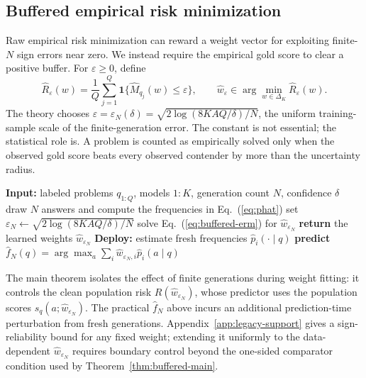 \subsection{Buffered empirical risk minimization}
\label{sec:method-buffer}

Raw empirical risk minimization can reward a weight vector for exploiting
finite-\(N\) sign errors near zero.  We instead require the empirical gold
score to clear a positive buffer.  For \(\varepsilon\ge0\), define
\begin{equation}
\widehat R_\varepsilon(w)
=
\frac1Q\sum_{j=1}^Q
\mathbf 1\{\widehat M_{q_j}(w)\le\varepsilon\},
\qquad
\widehat w_\varepsilon\in
\arg\min_{w\in\Delta_K}\widehat R_\varepsilon(w).
\label{eq:buffered-erm}
\end{equation}
The theory chooses
\(\varepsilon=\varepsilon_N(\delta)
=\sqrt{2\log(8KAQ/\delta)/N}\), the uniform training-sample scale of the
finite-generation error.  The constant is not essential; the statistical
role is.  A problem is counted as empirically solved only when the observed
gold score beats every observed contender by more than the uncertainty
radius.

\begin{algorithm}[t]
\caption{Margin-buffered weighted voting}
\label{alg:buffered}
\begin{algorithmic}[1]
\STATE \textbf{Input:} labeled problems \(q_{1:Q}\), models \(1{:}K\),
generation count \(N\), confidence \(\delta\)
  \STATE draw \(N\) answers and compute the frequencies in
  Eq.~(\ref{eq:phat})
\ENDFOR
\STATE set
\(\varepsilon_N\leftarrow\sqrt{2\log(8KAQ/\delta)/N}\)
\STATE solve Eq.~(\ref{eq:buffered-erm}) for
\(\widehat w_{\varepsilon_N}\)
\STATE \textbf{return} the learned weights \(\widehat w_{\varepsilon_N}\)
\STATE \textbf{Deploy:} estimate fresh frequencies
\(\widehat p_i(\cdot\mid q)\)
\STATE \textbf{predict}
\(\widehat f_N(q)=\arg\max_a\sum_i\widehat w_{\varepsilon_N,i}
\widehat p_i(a\mid q)\)
\end{algorithmic}
\end{algorithm}

The main theorem isolates the effect of finite generations during weight
fitting: it controls the clean population risk
\(R(\widehat w_{\varepsilon_N})\), whose predictor uses the population scores
\(s_q(a;\widehat w_{\varepsilon_N})\).  The practical
\(\widehat f_N\) above incurs an additional prediction-time perturbation from
fresh generations.  Appendix~\ref{app:legacy-support} gives a sign-reliability
bound for any fixed weight; extending it uniformly to the data-dependent
\(\widehat w_{\varepsilon_N}\) requires boundary control beyond the one-sided
comparator condition used by Theorem~\ref{thm:buffered-main}.

